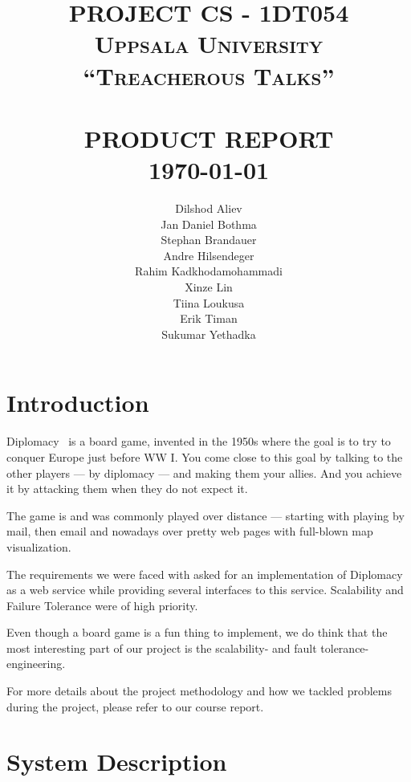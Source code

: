 \documentclass[11pt,a4paper]{report}
\title{    
            \large \textbf{\uppercase{Project CS - 1DT054}}\\    %
            \large \textsc{Uppsala University}\\[2.0cm]    %
            \normalsize \textsc{``Treacherous Talks''}   %
             \\[2.0cm]                                  %
            \HRule{0.5pt} \\                            %
            \LARGE \textbf{\uppercase{Product Report}}   %
            \HRule{2pt} \\ [0.5cm]                      %
            \normalsize \today                          %
        }
\author{Dilshod Aliev\\
        Jan Daniel Bothma\\
        Stephan Brandauer\\
        Andre Hilsendeger\\
        Rahim Kadkhodamohammadi\\
        Xinze Lin\\
        Tiina Loukusa\\
        Erik Timan\\
        Sukumar Yethadka\\
        }
\makeatletter
\newcommand{\hi}[1]{{\color{red}\em #1\/}\\}
\def\printtitle{
    {\centering \@title\par}}
\def\printauthor{
    {\centering \large \@author}}
\makeatother
\begin{document}
\thispagestyle{empty}                %

\printtitle
\vfill
\printauthor

\tableofcontents


\chapter{Introduction}
Diplomacy~\cite{diplomacy} is a board game, invented in the 1950s where the goal
is to try to conquer Europe just before WW I. You come close to this goal by
talking to the other players --- by diplomacy --- and making them your allies.
And you achieve it by attacking them when they do not expect it.

The game is and was commonly played over distance --- starting with playing by
mail, then email and nowadays over pretty web pages with full-blown map
visualization.

The requirements we were faced with asked for an implementation of Diplomacy as 
a web service while providing several interfaces to this service. Scalability
and Failure Tolerance were of high priority. 

Even though a board game is a fun thing to implement, we do think that the most
interesting part of our project is the scalability- and fault tolerance-
engineering.

For more details about the project methodology and 
how we tackled problems during the project, please refer to our course report.

\chapter{System Description}
\end{document}
